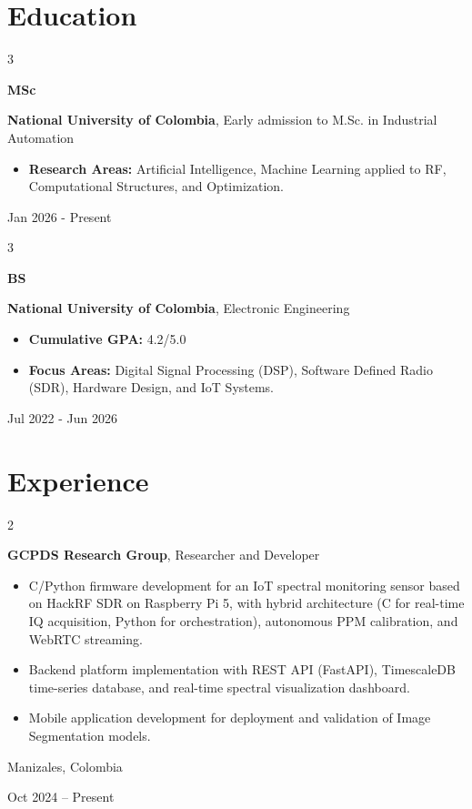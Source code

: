 \documentclass[10pt, letterpaper]{article}
\newenvironment{highlights}{
    \begin{itemize}[
        topsep=0.10 cm,
        parsep=0.10 cm,
        partopsep=0pt,
        itemsep=0pt,
        leftmargin=0.4 cm + 10pt
    ]
}{
    \end{itemize}
} %
\newenvironment{twocolentry}[2][]{
    \onecolentry
    \def\secondColumn{#2}
    \setcolumnwidth{\fill, 4.5 cm}
    \begin{paracol}{2}
}{
    \switchcolumn \raggedleft \secondColumn
    \end{paracol}
    \endonecolentry
} %
\newenvironment{threecolentry}[3][]{
    \onecolentry
    \def\thirdColumn{#3}
    \setcolumnwidth{1 cm, \fill, 4.5 cm}
    \begin{paracol}{3}
    {\raggedright #2} \switchcolumn
}{
    \switchcolumn \raggedleft \thirdColumn
    \end{paracol}
    \endonecolentry
} %
\begin{document}
        \vspace{0.2 cm}

    \section{Education}

        \begin{threecolentry}{\textbf{MSc}}{
            Jan 2026 - Present
        }
            \textbf{National University of Colombia}, Early admission to M.Sc. in Industrial Automation
            \begin{highlights}
                \item \textbf{Research Areas:} Artificial Intelligence, Machine Learning applied to RF, Computational Structures, and Optimization.
            \end{highlights}
        \end{threecolentry}

        \begin{threecolentry}{\textbf{BS}}{
            Jul 2022 - Jun 2026
        }
            \textbf{National University of Colombia}, Electronic Engineering
            \begin{highlights}
                \item \textbf{Cumulative GPA:} 4.2/5.0
                \item \textbf{Focus Areas:} Digital Signal Processing (DSP), Software Defined Radio (SDR), Hardware Design, and IoT Systems.
            \end{highlights}
        \end{threecolentry}

    \section{Experience}

        \begin{twocolentry}{
            Manizales, Colombia

        Oct 2024 -- Present
        }
            \textbf{GCPDS Research Group}, Researcher and Developer
            \begin{highlights}
                \item C/Python firmware development for an IoT spectral monitoring sensor based on HackRF SDR on Raspberry Pi 5, with hybrid architecture (C for real-time IQ acquisition, Python for orchestration), autonomous PPM calibration, and WebRTC streaming.
                \item Backend platform implementation with REST API (FastAPI), TimescaleDB time-series database, and real-time spectral visualization dashboard.
                \item Mobile application development for deployment and validation of Image Segmentation models.
            \end{highlights}
        \end{twocolentry}
\end{document}
